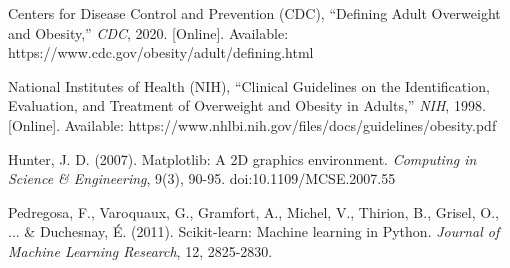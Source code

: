 \documentclass[10pt,journal,compsoc]{IEEEtran}
\begin{document}
\begin{thebibliography}{1}
Centers for Disease Control and Prevention (CDC), ``Defining Adult Overweight and Obesity,'' \emph{CDC}, 2020. [Online]. Available: https://www.cdc.gov/obesity/adult/defining.html

National Institutes of Health (NIH), ``Clinical Guidelines on the Identification, Evaluation, and Treatment of Overweight and Obesity in Adults,'' \emph{NIH}, 1998. [Online]. Available: https://www.nhlbi.nih.gov/files/docs/guidelines/obesity.pdf

Hunter, J. D. (2007). Matplotlib: A 2D graphics environment. \textit{Computing in Science \& Engineering}, 9(3), 90-95. doi:10.1109/MCSE.2007.55


Pedregosa, F., Varoquaux, G., Gramfort, A., Michel, V., Thirion, B., Grisel, O., ... \& Duchesnay, É. (2011). Scikit-learn: Machine learning in Python. \textit{Journal of Machine Learning Research}, 12, 2825-2830.


\end{thebibliography}
\end{document}
